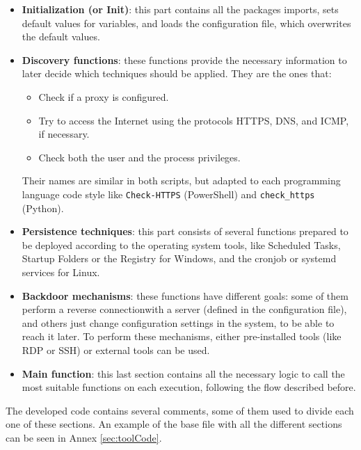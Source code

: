 \begin{itemize}
\item \textbf{Initialization (or Init)}: this part contains all the packages imports, sets default values for variables, and loads the configuration file, which overwrites the default values.

\item \textbf{Discovery functions}: these functions provide the necessary information to later decide which techniques should be applied. They are the ones that: 	
\begin{itemize}
\item Check if a proxy is configured.
\item Try to access the Internet using the protocols HTTPS, DNS, and ICMP, if necessary.
\item Check both the user and the process privileges.
\end{itemize}

Their names are similar in both scripts, but adapted to each programming language code style like \texttt{Check-HTTPS} (PowerShell) and \texttt{check\_https} (Python).

\item \textbf{Persistence techniques}: this part consists of several functions prepared to be deployed according to the operating system tools, like Scheduled Tasks, Startup Folders or the Registry for Windows, and the cronjob or systemd services for Linux. 

\item \textbf{Backdoor mechanisms}: these functions have different goals: some of them perform a reverse connection\footnotemark with a server (defined in the configuration file), and others just change configuration settings in the system, to be able to reach it later. To perform these mechanisms, either pre-installed tools (like RDP or SSH) or external tools can be used. 

\item \textbf{Main function}: this last section contains all the necessary logic to call the most suitable functions on each execution, following the flow described before.
\end{itemize}

The developed code contains several comments, some of them used to divide each one of these sections.  An example of the base file with all the different sections can be seen in Annex \ref{sec:toolCode}.


